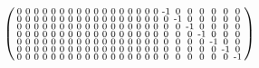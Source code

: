 \documentclass[pdftex,a4paper,parskip,listof=totoc,bibliography=totoc,onehalfspacing,12pt]{scrreprt}
\begin{document}
\begin{align*}
\begin{psmallmatrix}
0 & 0 & 0 & 0 & 0 & 0 & 0 & 0 & 0 & 0 & 0 & 0 & 0 & 0 & 0 & 0 & 0 & \text{-}1 & 0 & 0 & 0 & 0 & 0 & 0 \\
0 & 0 & 0 & 0 & 0 & 0 & 0 & 0 & 0 & 0 & 0 & 0 & 0 & 0 & 0 & 0 & 0 & 0 & \text{-}1 & 0 & 0 & 0 & 0 & 0 \\
0 & 0 & 0 & 0 & 0 & 0 & 0 & 0 & 0 & 0 & 0 & 0 & 0 & 0 & 0 & 0 & 0 & 0 & 0 & \text{-}1 & 0 & 0 & 0 & 0 \\
0 & 0 & 0 & 0 & 0 & 0 & 0 & 0 & 0 & 0 & 0 & 0 & 0 & 0 & 0 & 0 & 0 & 0 & 0 & 0 & \text{-}1 & 0 & 0 & 0 \\
0 & 0 & 0 & 0 & 0 & 0 & 0 & 0 & 0 & 0 & 0 & 0 & 0 & 0 & 0 & 0 & 0 & 0 & 0 & 0 & 0 & \text{-}1 & 0 & 0 \\
0 & 0 & 0 & 0 & 0 & 0 & 0 & 0 & 0 & 0 & 0 & 0 & 0 & 0 & 0 & 0 & 0 & 0 & 0 & 0 & 0 & 0 & \text{-}1 & 0 \\
0 & 0 & 0 & 0 & 0 & 0 & 0 & 0 & 0 & 0 & 0 & 0 & 0 & 0 & 0 & 0 & 0 & 0 & 0 & 0 & 0 & 0 & 0 & \text{-}1 \\
\end{psmallmatrix}
\end{align*}
\end{document}
